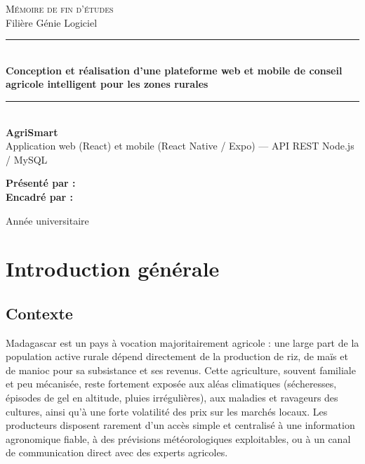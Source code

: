 \documentclass[12pt,a4paper]{report}
\begin{document}
\begin{titlepage}
\centering
\vspace*{1cm}
{\Large \textsc{Mémoire de fin d'études}}\\[0.3cm]
{\large Filière Génie Logiciel}\\[2cm]

\rule{\linewidth}{0.5mm}\\[0.6cm]
{\huge \bfseries Conception et réalisation d'une plateforme web et mobile de conseil agricole intelligent pour les zones rurales}\\[0.4cm]
\rule{\linewidth}{0.5mm}\\[1.5cm]

{\Large \textbf{AgriSmart}}\\[0.3cm]
{\normalsize Application web (React) et mobile (React Native / Expo) --- API REST Node.js / MySQL}\\[2.5cm]

\begin{flushleft}
\large
\textbf{Présenté par :} \underline{\hspace{6cm}}\\[0.4cm]
\textbf{Encadré par :} \underline{\hspace{6cm}}\\
\end{flushleft}

\vfill
{\large Année universitaire \underline{\hspace{4cm}}}
\end{titlepage}

\tableofcontents
\listoftables
\clearpage

\chapter{Introduction générale}

\section{Contexte}

Madagascar est un pays à vocation majoritairement agricole : une large part de la population active rurale dépend directement de la production de riz, de maïs et de manioc pour sa subsistance et ses revenus. Cette agriculture, souvent familiale et peu mécanisée, reste fortement exposée aux aléas climatiques (sécheresses, épisodes de gel en altitude, pluies irrégulières), aux maladies et ravageurs des cultures, ainsi qu'à une forte volatilité des prix sur les marchés locaux. Les producteurs disposent rarement d'un accès simple et centralisé à une information agronomique fiable, à des prévisions météorologiques exploitables, ou à un canal de communication direct avec des experts agricoles.
\end{document}
